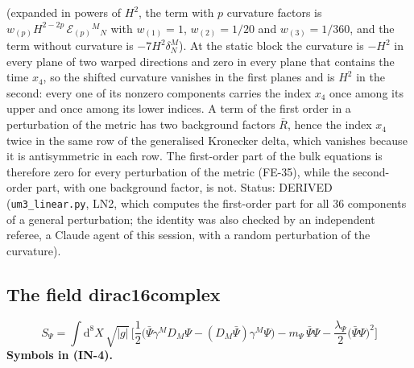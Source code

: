 \documentclass[
  10pt,
]{article}
\begin{document}
(expanded in powers of \(H^2\), the term with \(p\) curvature factors is
\(w_{(p)}H^{2-2p}\,\mathcal{E}_{(p)}{}^M{}_N\) with \(w_{(1)} = 1\),
\(w_{(2)} = 1/20\) and \(w_{(3)} = 1/360\), and the term without
curvature is \(-7H^2\delta^M_N\)). At the static block the curvature is
\(-H^2\) in every plane of two warped directions and zero in every plane
that contains the time \(x_4\), so the shifted curvature vanishes in the
first planes and is \(H^2\) in the second: every one of its nonzero
components carries the index \(x_4\) once among its upper and once among
its lower indices. A term of the first order in a perturbation of the
metric has two background factors \(\bar R\), hence the index \(x_4\)
twice in the same row of the generalised Kronecker delta, which vanishes
because it is antisymmetric in each row. The first-order part of the
bulk equations is therefore zero for every perturbation of the metric
(FE-35), while the second-order part, with one background factor, is
not. Status: DERIVED (\texttt{um3\_linear.py}, LN2, which computes the
first-order part for all 36 components of a general perturbation; the
identity was also checked by an independent referee, a Claude agent of
this session, with a random perturbation of the curvature).

\hypertarget{the-field-dirac16complex}{%
\subsection{The field dirac16complex}\label{the-field-dirac16complex}}

\[
S_\Psi = \int\mathrm{d}^8X\,\sqrt{\lvert g\rvert}\,\Big[\frac12\big(\bar\Psi\gamma^MD_M\Psi - (D_M\bar\Psi)\gamma^M\Psi\big)
 - m_\Psi\,\bar\Psi\Psi - \frac{\lambda_\Psi}{2}\big(\bar\Psi\Psi\big)^2\Big] \tag{IN-4}
\] \textbf{Symbols in (IN-4).}
\end{document}
